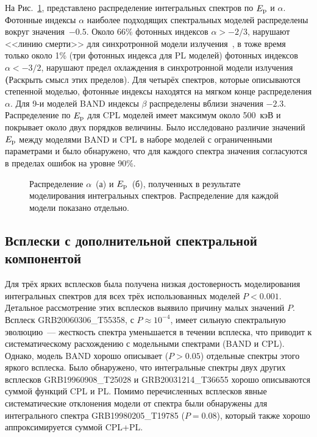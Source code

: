 На Рис.~\ref{fig:par_dist}, представлено распределение интегральных спектров по $E_{\mathrm{p}}$ и $\alpha$.
Фотонные индексы $\alpha$ наиболее подходящих спектральных моделей распределены 
вокруг значения~$-0.5$. 
Около 66\% фотонных индексов $\alpha > -2/3$, нарушают <<линию смерти>> для 
синхротронной модели излучения~\citep{Preece_1998ApJL}, в тоже время только около 
1\% (три фотонных индекса для PL моделей) фотонных индексов $\alpha< -3/2$, 
нарушают предел охлаждения в синхротронной модели излучения \textbf(Раскрыть смысл этих пределов). 
Для четырёх спектров, которые описываются степенной моделью, фотонные индексы 
находятся на мягком конце распределения $\alpha$. Для 9-и моделей BAND индексы $\beta$
распределены вблизи значения $-2.3$.
Распределение по $E_{\mathrm{p}}$ для CPL моделей имеет максимум около 500~кэВ 
и покрывает около двух порядков величины. 
Было исследовано различие значений $E_{\mathrm{p}}$ между моделями BAND и CPL в наборе 
моделей с ограниченными параметрами и было обнаружено, что для каждого спектра значения согласуются
в пределах ошибок на уровне 90\%.

\begin{figure}
	\begin{minipage}[h]{0.5\textwidth}
    \end{minipage}
    \hfill
    \begin{minipage}[h]{0.5\textwidth}
	\end{minipage}
    \caption{
    Распределение $\alpha$~(а) и $E_{\mathrm{p}}$~(б), полученных 
    в результате моделирования интегральных спектров. Распределение для каждой модели
    показано отдельно.
    \label{fig:par_dist} }
\end{figure}

\subsection{Всплески с дополнительной спектральной компонентой}
Для трёх ярких всплесков была получена низкая достоверность моделирования 
интегральных спектров для всех трёх использованных моделей $P<0.001$. 
Детальное рассмотрение этих всплесков выявило причину малых значений $P$.
Всплеск GRB20060306\_T55358, с $P \approx 10^{-4}$, имеет сильную 
спектральную эволюцию~--- жесткость спектра уменьшается в течении всплеска, 
что приводит к систематическому расхождению с модельными спектрами (BAND и CPL).
Однако, модель BAND хорошо описывает ($P>0.05$) отдельные спектры этого яркого всплеска.
Было обнаружено, что интегральные спектры двух других всплесков GRB19960908\_T25028 и GRB20031214\_T36655
хорошо описываются суммой функций CPL и PL.
Помимо перечисленных всплесков явные систематические отклонения модели от спектра
были обнаружены для интегрального спектра GRB19980205\_T19785 ($P=0.08$), 
который также хорошо аппроксимируется суммой CPL+PL.
 
